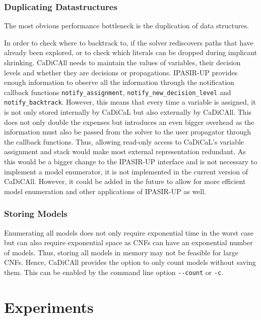 \documentclass[12pt,a4paper]{article}
\begin{document}
\subsubsection{Duplicating Datastructures}

The most obvious performance bottleneck is the duplication of data structures.

In order to check where to backtrack to, if the solver rediscovers paths that have already been explored, or to check which literals can be dropped during implicant shrinking. CaDiCAll needs to maintain the values of variables, their decision levels and whether they are decisions or propagations. IPASIR-UP provides enough information to observe all the information through the notification callback functions \verb|notify_assignment|, \verb|notify_new_decision_level| and \verb|notify_backtrack|. However, this means that every time a variable is assigned, it is not only stored internally by CaDiCaL but also externally by CaDiCAll. This does not only double the expenses but introduces an even bigger overhead as the information must also be passed from the solver to the user propagator through the callback functions. Thus, allowing read-only access to CaDiCaL's variable assignment and stack would make most external representation redundant. As this would be a bigger change to the IPASIR-UP interface and is not necessary to implement a model enumerator, it is not implemented in the current version of CaDiCAll. However, it could be added in the future to allow for more efficient model enumeration and other applications of IPASIR-UP as well.

\subsubsection{Storing Models}

Enumerating all models does not only require exponential time in the worst case but can also require exponential space as CNFs can have an exponential number of models. Thus, storing all models in memory may not be feasible for large CNFs. Hence, CaDiCAll provides the option to only count models without saving them. This can be enabled by the command line option \verb|--count| or \verb|-c|.

\newpage

\section{Experiments}
\label{sec:experiments}
\end{document}
